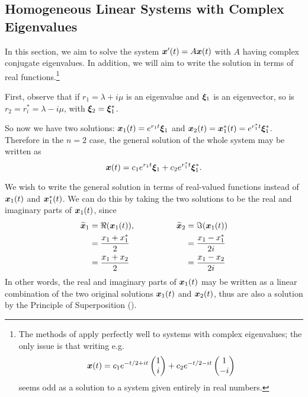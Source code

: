 \subsection{Homogeneous Linear Systems with Complex Eigenvalues}\label{sec:complexeigs}

In this section, we aim to solve the system $\bm{x}'(t) = A\bm{x}(t)$ with $A$ having complex conjugate eigenvalues. In addition, we will aim to write the solution in terms of real functions.\footnote{The methods of  apply perfectly well to systems with complex eigenvalues; the only issue is that writing e.g. \[\bm{x}(t) = c_1 e^{-t/2 + it}\begin{pmatrix}1 \\ i\end{pmatrix} + c_2 e^{-t/2 - it}\begin{pmatrix}1 \\ -i\end{pmatrix}\] seems odd as a solution to a system given entirely in real numbers.}

First, observe that if $r_1 = \lambda + i\mu$ is an eigenvalue and $\bm{\xi}_1$ is an eigenvector, so is $r_2 = r_i^* = \lambda - i\mu$, with $\bm{\xi}_2 = \bm{\xi}_1^*$.

So now we have two solutions: $\bm{x}_1(t) = e^{r_1t} \bm{\xi}_1$ and $\bm{x}_2(t) = \bm{x}_1^*(t) = e^{r_1^*t} \bm{\xi}_1^*$. Therefore in the $n=2$ case, the general solution of the whole system may be written as
\begin{equation*}\label{eq:complexgen}
	\bm{x}(t) = c_1 e^{r_1t} \bm{\xi}_1 + c_2 e^{r_1^*t} \bm{\xi}_1^*.
\end{equation*}

We wish to write the general solution in terms of real-valued functions instead of $\bm{x}_1(t)$ and $\bm{x}_1^*(t)$. We can do this by taking the two solutions to be the real and imaginary parts of $\bm{x}_1(t)$, since
\begin{equation*}
	\begin{alignedat}{2}
		\widetilde{\bm{x}}_1 &= \Re(\bm{x}_1(t)), \hspace{50pt} \widetilde{\bm{x}}_2 &&= \Im(\bm{x}_1(t)) \\
		&= \frac{x_1 + x_1^*}{2} &&= \frac{x_1 - x_1^*}{2i} \\
		&= \frac{x_1 + x_2}{2} &&= \frac{x_1 - x_2}{2i}
	\end{alignedat}
\end{equation*}
In other words, the real and imaginary parts of $\bm{x}_1(t)$ may be written as a linear combination of the two original solutions $\bm{x}_1(t)$ and $\bm{x}_2(t)$, thus are also a solution by the Principle of Superposition ().

